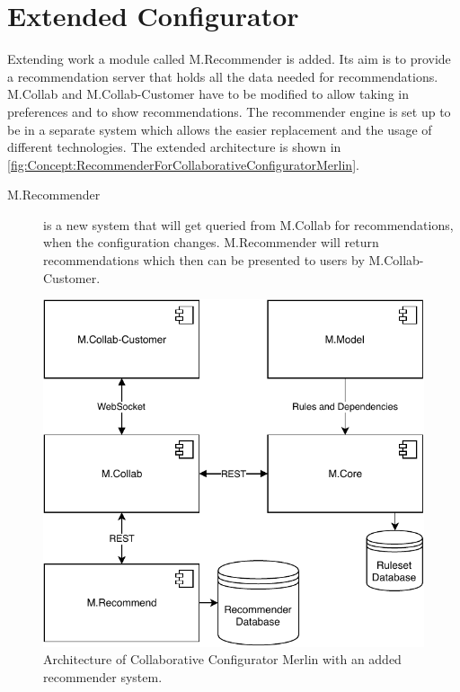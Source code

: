 \section{Extended Configurator}
\label{sec:Concept:ExtendedConfigurator}

Extending \citeauthor{raabKollaborativeProduktkonfigurationEchtzeit2019} work a module called M.Recommender is added. Its aim is to provide a recommendation server that holds all the data needed for recommendations. M.Collab and M.Collab-Customer have to be modified to allow taking in preferences and to show  recommendations. The recommender engine is set up to be in a separate system which allows the easier replacement and the usage of different technologies. The extended architecture is shown in \autoref{fig:Concept:RecommenderForCollaborativeConfiguratorMerlin}.

\begin{description}
    \item[M.Recommender] is a new system that will get queried from M.Collab for recommendations, when the configuration changes. M.Recommender will return recommendations which then can be presented to users by M.Collab-Customer.
\end{description}

\begin{figure}
    \centering
    \includegraphics{./figures/40_concept/MerlinCollabRecommender.pdf}
    \caption{Architecture of Collaborative Configurator Merlin with an added recommender system.}
    \label{fig:Concept:RecommenderForCollaborativeConfiguratorMerlin}
\end{figure}